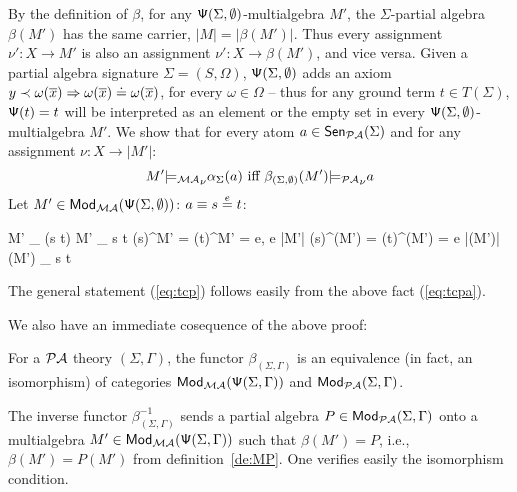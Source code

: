 \documentclass[10pt]{article}
\begin{document}
\begin{PROOF}
\begin{equation}
\end{equation}
\noindent
By the definition of $\beta$, for any ${\sf {\Psi}}(\Sigma,\emptyset)$-multialgebra
$M'$, the $\Sigma$-partial algebra $\beta(M')$ has the same carrier, $|M|=
|\beta(M')|$. Thus every assignment $\nu': X \to M'$ is also an assignment
$\nu': X \to \beta(M')$, and vice versa.  Given a partial algebra signature
$\Sigma=(S,\Omega)$, ${\sf {\Psi}}(\Sigma,\emptyset)$ adds an axiom $ y \prec
\omega(\overline{x}) \Rightarrow \omega(\overline{x}) \mathrel{\dot{=} } \omega(\overline{x})$,
for every $\omega \in \Omega$ -- thus for any ground term $t\in T(\Sigma)$,
${\sf {\Psi}}(t)=t$ will be interpreted as an element or the empty set in every
${\sf {\Psi}}(\Sigma,\emptyset)$-multialgebra $M'$.  We show that for every atom $a
\in {\sf {Sen}}_{{\mathcal{PA}}}(\Sigma)$ and for any assignment $\nu:X\to|M'|$:
\begin{equation}\label{eq:tcpa}
M' {\models_{{\mathcal{MA}}}}_{\nu} \alpha_{\Sigma}(a) \mbox{ iff 
} \beta_{(\Sigma,\emptyset)} (M') {\models_{{\mathcal{PA}}}}_{\nu} a
\end{equation}
%
Let $M' \in {\sf {Mod}}_{{\mathcal{MA}}}({\sf {\Psi}}(\Sigma,\emptyset))$:
$a \equiv s \stackrel{e}{=} t$:	
		\begin{eqp}
			M' \models_{\nu} \alpha(s \eequal t)
			M' \models_{\nu} s \eleq t
			{\nu}(s)^{M'} = {\nu}(t)^{M'} = {e}, e \in |M'|
			{\nu}(s)^{\beta(M')} = {\nu}(t)^{\beta(M')} = e \in 
|\beta(M')|
			{\beta(M')} \models_{\nu} s \eequal t
		\end{eqp}
The general statement (\ref{eq:tcp}) follows easily from the above fact (\ref{eq:tcpa}).
\end{PROOF}
We also have an immediate cosequence of the above proof:
\begin{fact}\label{fa:iso}
For a ${\mathcal{PA}}$ theory $(\Sigma,\Gamma)$, 
the functor $\beta_{(\Sigma,\Gamma)}$ is an equivalence (in fact, an
isomorphism) of categories ${\sf {Mod}}_{{\mathcal{MA}}}({\sf {\Psi}}(\Sigma,\Gamma))$ and
${\sf {Mod}}_{{\mathcal{PA}}}(\Sigma,\Gamma)$. 
\end{fact}

\begin{PROOF}
The
inverse functor $\beta^{-1}_{(\Sigma,\Gamma)}$ sends a partial algebra
$P\in{\sf {Mod}}_{{\mathcal{PA}}}(\Sigma,\Gamma)$ onto a multialgebra
$M'\in{\sf {Mod}}_{{\mathcal{MA}}}({\sf {\Psi}}(\Sigma,\Gamma))$ such that $\beta(M')=P$, i.e.,
$\beta(M')=P(M')$ from definition~\ref{de:MP}. One verifies easily the
isomorphism condition.
\end{PROOF}
\end{document}
